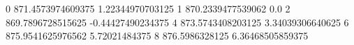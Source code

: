 0 871.4573974609375 1.22344970703125
1 870.2339477539062 0.0
2 869.7896728515625 -0.44427490234375
4 873.5743408203125 3.34039306640625
6 875.9541625976562 5.72021484375
8 876.5986328125 6.36468505859375
